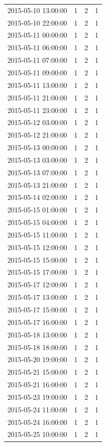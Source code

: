 \begin{tabular}{lrrr}
2015-05-10 13:00:00 & 1 & 2 & 1 \\
2015-05-10 22:00:00 & 1 & 2 & 1 \\
2015-05-11 00:00:00 & 1 & 2 & 1 \\
2015-05-11 06:00:00 & 1 & 2 & 1 \\
2015-05-11 07:00:00 & 1 & 2 & 1 \\
2015-05-11 09:00:00 & 1 & 2 & 1 \\
2015-05-11 13:00:00 & 1 & 2 & 1 \\
2015-05-11 21:00:00 & 1 & 2 & 1 \\
2015-05-11 23:00:00 & 1 & 2 & 1 \\
2015-05-12 03:00:00 & 1 & 2 & 1 \\
2015-05-12 21:00:00 & 1 & 2 & 1 \\
2015-05-13 00:00:00 & 1 & 2 & 1 \\
2015-05-13 03:00:00 & 1 & 2 & 1 \\
2015-05-13 07:00:00 & 1 & 2 & 1 \\
2015-05-13 21:00:00 & 1 & 2 & 1 \\
2015-05-14 02:00:00 & 1 & 2 & 1 \\
2015-05-15 01:00:00 & 1 & 2 & 1 \\
2015-05-15 04:00:00 & 1 & 2 & 1 \\
2015-05-15 11:00:00 & 1 & 2 & 1 \\
2015-05-15 12:00:00 & 1 & 2 & 1 \\
2015-05-15 15:00:00 & 1 & 2 & 1 \\
2015-05-15 17:00:00 & 1 & 2 & 1 \\
2015-05-17 12:00:00 & 1 & 2 & 1 \\
2015-05-17 13:00:00 & 1 & 2 & 1 \\
2015-05-17 15:00:00 & 1 & 2 & 1 \\
2015-05-17 16:00:00 & 1 & 2 & 1 \\
2015-05-18 13:00:00 & 1 & 2 & 1 \\
2015-05-18 18:00:00 & 1 & 2 & 1 \\
2015-05-20 19:00:00 & 1 & 2 & 1 \\
2015-05-21 15:00:00 & 1 & 2 & 1 \\
2015-05-21 16:00:00 & 1 & 2 & 1 \\
2015-05-23 19:00:00 & 1 & 2 & 1 \\
2015-05-24 11:00:00 & 1 & 2 & 1 \\
2015-05-24 16:00:00 & 1 & 2 & 1 \\
2015-05-25 10:00:00 & 1 & 2 & 1 \\

\end{tabular}

